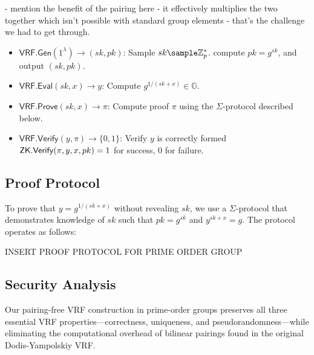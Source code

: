 - mention the benefit of the pairing here - it effectively multiplies the two together which isn't possible with standard group elements - that's the challenge we had to get through.



\begin{itemize}
    \item $\mathsf{VRF.Gen}(1^\lambda) \to (sk, pk)$: Sample $sk \sample \mathbb{Z}_p^*$. compute $pk = g^{sk}$, and output $(sk, pk)$.
    
    \item $\mathsf{VRF.Eval}(sk, x) \to y$: Compute $g^{1/(sk + x)} \in \mathbb{G}$.
    
    \item $\mathsf{VRF.Prove}(sk, x) \to \pi$: Compute proof $\pi$ using the $\Sigma$-protocol described below.
    
    \item $\mathsf{VRF.Verify}(y, \pi) \to \{0, 1\}$: Verify $y$ is correctly formed $\mathsf{ZK.Verify}(\pi, y, x, pk) = 1$ for success, 0 for failure.
\end{itemize}


\subsection{Proof Protocol}
To prove that $y = g^{1/(sk+x)}$ without revealing $sk$, we use a $\Sigma$-protocol that demonstrates knowledge of $sk$ such that $pk = g^{sk}$ and $y^{sk+x} = g$. The protocol operates as follows:


INSERT PROOF PROTOCOL FOR PRIME ORDER GROUP




\subsection{Security Analysis}

Our pairing-free VRF construction in prime-order groups preserves all three essential VRF properties—correctness, uniqueness, and pseudorandomness—while eliminating the computational overhead of bilinear pairings found in the original Dodis-Yampolskiy VRF.

